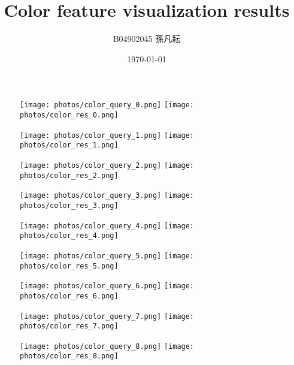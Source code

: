 \documentclass{article}
\begin{document}
\title{Color feature visualization results}
\author{B04902045 孫凡耘}
\date{\today}
\maketitle

\begin{figure}[!ht]
\centering
\texttt{[image: photos/color\_query\_0.png]}
\texttt{[image: photos/color\_res\_0.png]}
\end{figure}

\begin{figure}[!ht]
\centering
\texttt{[image: photos/color\_query\_1.png]}
\texttt{[image: photos/color\_res\_1.png]}
\end{figure}

\begin{figure}[!ht]
\centering
\texttt{[image: photos/color\_query\_2.png]}
\texttt{[image: photos/color\_res\_2.png]}
\end{figure}

\begin{figure}[!ht]
\centering
\texttt{[image: photos/color\_query\_3.png]}
\texttt{[image: photos/color\_res\_3.png]}
\end{figure}

\begin{figure}[!ht]
\centering
\texttt{[image: photos/color\_query\_4.png]}
\texttt{[image: photos/color\_res\_4.png]}
\end{figure}

\begin{figure}[!ht]
\centering
\texttt{[image: photos/color\_query\_5.png]}
\texttt{[image: photos/color\_res\_5.png]}
\end{figure}

\begin{figure}[!ht]
\centering
\texttt{[image: photos/color\_query\_6.png]}
\texttt{[image: photos/color\_res\_6.png]}
\end{figure}

\begin{figure}[!ht]
\centering
\texttt{[image: photos/color\_query\_7.png]}
\texttt{[image: photos/color\_res\_7.png]}
\end{figure}

\begin{figure}[!ht]
\centering
\texttt{[image: photos/color\_query\_8.png]}
\texttt{[image: photos/color\_res\_8.png]}
\end{figure}
\end{document}
